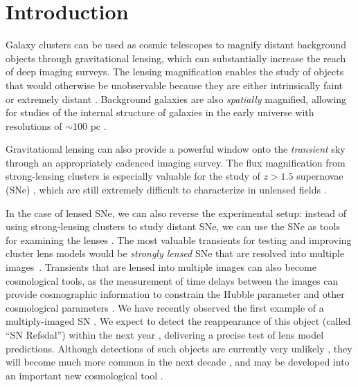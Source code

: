 \section{Introduction}
\label{sec:Introduction}

Galaxy clusters can be used as cosmic telescopes to magnify distant
background objects through gravitational lensing, which can
substantially increase the reach of deep imaging surveys.  The lensing
magnification enables the study of objects that would otherwise be
unobservable because they are either intrinsically
faint \citep[e.g.][]{Schenker:2012,Alavi:2014} or extremely
distant \citep[e.g.][]{Franx:1997,Ellis:2001,Hu:2002,Kneib:2004,Richard:2006,Richard:2008,Bouwens:2009a,Maizy:2010,Zheng:2012,Coe:2013,Bouwens:2014,Zitrin:2014b}.
Background galaxies are also {\it spatially} magnified, allowing for
studies of the internal structure of galaxies in the early universe
with resolutions of $\sim$100
pc \citep[e.g.][]{Stark:2008,Jones:2010,Yuan:2011,Wuyts:2014,Livermore:2015}.

Gravitational lensing can also provide a powerful window onto the {\it
transient} sky through an appropriately cadenced imaging survey.  The
flux magnification from strong-lensing clusters is especially valuable
for the study of $z>1.5$ supernovae
(SNe) \citep[e.g.][]{Kovner:1988,Kolatt:1998,Sullivan:2000,Saini:2000,Gunnarsson:2003,Goobar:2009,Postman:2012},
which are still extremely difficult to characterize in unlensed
fields \citep[e.g.][]{Riess:2001,Riess:2007,Suzuki:2012,Rodney:2012,Rubin:2013,Jones:2013}.


In the case of lensed SNe, we can also reverse the experimental setup:
instead of using strong-lensing clusters to study distant SNe, we can
use the SNe as tools for examining the lenses \citep{Riehm:2011}.  The
most valuable transients for testing and improving cluster lens models
would be {\it strongly lensed} SNe that are resolved into multiple
images\ \citep{Holz:2001,Oguri:2003}.  Transients that are lensed into
multiple images can also become cosmological tools, as the measurement
of time delays between the images can provide cosmographic information
to constrain the Hubble parameter \citep{Refsdal:1964} and other
cosmological parameters \citep{Linder:2011}.  We have recently
observed the first example of a multiply-imaged SN \citep{Kelly:2015}.
We expect to detect the reappearance of this object (called ``SN
Refsdal'') within the next
year \citep{Oguri:2015,Sharon:2015,Diego:2015}, delivering a precise
test of lens model predictions.  Although detections of such objects
are currently very unlikely \citep{Li:2012}, they will become much
more common in the next decade \citep{Coe:2009,Dobke:2009}, and may be
developed into an important new cosmological
tool \citep{Oguri:2010,Linder:2011}.


